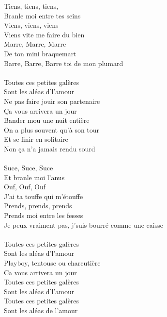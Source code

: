\breakpage
Tiens, tiens, tiens,
\\Branle moi entre tes seins
\\Viens, viens, viens
\\Viens vite me faire du bien
\\Marre, Marre, Marre
\\De ton mini braquemart
\\Barre, Barre, Barre toi de mon plumard \bissimple
\\\\Toutes ces petites galères
\\Sont les aléas d'l'amour
\\Ne pas faire jouir son partenaire
\\Ça vous arrivera un jour
\\Bander mou une nuit entière
\\On a plus souvent qu'à son tour
\\Et se finir en solitaire
\\Non ça n'a jamais rendu sourd
\\\\Suce, Suce, Suce
\\Et branle moi l'anus
\\Ouf, Ouf, Ouf
\\J'ai ta touffe qui m'étouffe
\\Prends, prends, prends
\\Prends moi entre les fesses
\\Je peux vraiment pas, j'suis bourré comme une caisse \bissimple
\\\\Toutes ces petites galères
\\Sont les aléas d'l'amour
\\Playboy, tentouse ou charcutière
\\Ca vous arrivera un jour
\\Toutes ces petites galères
\\Sont les aléas d'l'amour
\\Toutes ces petites galères
\\Sont les aléas de l'amour

\breakpage